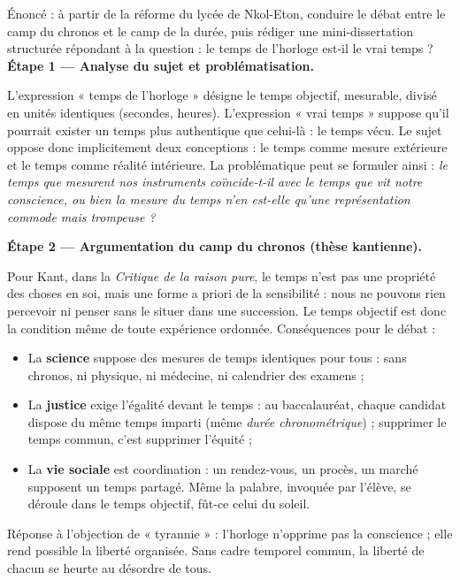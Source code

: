 \documentclass[11pt]{article}
\newcommand{\cle}[1]{{\popxbold\color{popdark}#1}}
\begin{document}
\begin{exoresolu}
Énoncé : à partir de la réforme du lycée de Nkol-Eton, conduire le débat entre le camp du \cle{chronos} et le camp de la \cle{durée}, puis rédiger une mini-dissertation structurée répondant à la question : le temps de l'horloge est-il le vrai temps ?
\tcblower
\textbf{Étape 1 — Analyse du sujet et problématisation.}\par
L'expression « temps de l'horloge » désigne le temps objectif, mesurable, divisé en unités identiques (secondes, heures). L'expression « vrai temps » suppose qu'il pourrait exister un temps plus authentique que celui-là : le temps vécu. Le sujet oppose donc implicitement deux conceptions : le temps comme mesure extérieure et le temps comme réalité intérieure. La problématique peut se formuler ainsi : \emph{le temps que mesurent nos instruments coïncide-t-il avec le temps que vit notre conscience, ou bien la mesure du temps n'en est-elle qu'une représentation commode mais trompeuse ?}

\textbf{Étape 2 — Argumentation du camp du \cle{chronos} (thèse kantienne).}\par
Pour Kant, dans la \emph{Critique de la raison pure}, le temps n'est pas une propriété des choses en soi, mais une \cle{forme a priori de la sensibilité} : nous ne pouvons rien percevoir ni penser sans le situer dans une succession. Le temps objectif est donc la condition même de toute expérience ordonnée. Conséquences pour le débat :
\begin{itemize}
\item La \textbf{science} suppose des mesures de temps identiques pour tous : sans \cle{chronos}, ni physique, ni médecine, ni calendrier des examens ;
\item La \textbf{justice} exige l'égalité devant le temps : au baccalauréat, chaque candidat dispose du même temps imparti (même \emph{durée chronométrique}) ; supprimer le temps commun, c'est supprimer l'équité ;
\item La \textbf{vie sociale} est coordination : un rendez-vous, un procès, un marché supposent un temps partagé. Même la palabre, invoquée par l'élève, se déroule dans le temps objectif, fût-ce celui du soleil.
\end{itemize}
Réponse à l'objection de « tyrannie » : l'horloge n'opprime pas la conscience ; elle rend possible la liberté organisée. Sans cadre temporel commun, la liberté de chacun se heurte au désordre de tous.


\end{exoresolu}
\end{document}
